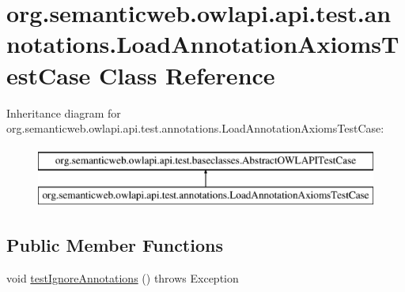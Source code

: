 \hypertarget{classorg_1_1semanticweb_1_1owlapi_1_1api_1_1test_1_1annotations_1_1_load_annotation_axioms_test_case}{\section{org.\-semanticweb.\-owlapi.\-api.\-test.\-annotations.\-Load\-Annotation\-Axioms\-Test\-Case Class Reference}
\label{classorg_1_1semanticweb_1_1owlapi_1_1api_1_1test_1_1annotations_1_1_load_annotation_axioms_test_case}
}
Inheritance diagram for org.\-semanticweb.\-owlapi.\-api.\-test.\-annotations.\-Load\-Annotation\-Axioms\-Test\-Case\-:\begin{figure}[H]
\begin{center}
\leavevmode
\includegraphics[height=2.000000cm]{classorg_1_1semanticweb_1_1owlapi_1_1api_1_1test_1_1annotations_1_1_load_annotation_axioms_test_case}
\end{center}
\end{figure}
\subsection*{Public Member Functions}
\begin{DoxyCompactItemize}
\item 
void \hyperlink{classorg_1_1semanticweb_1_1owlapi_1_1api_1_1test_1_1annotations_1_1_load_annotation_axioms_test_case_acab5a0bbd1376343c1e5d8d57dc49265}{test\-Ignore\-Annotations} ()  throws Exception 
\end{DoxyCompactItemize}
